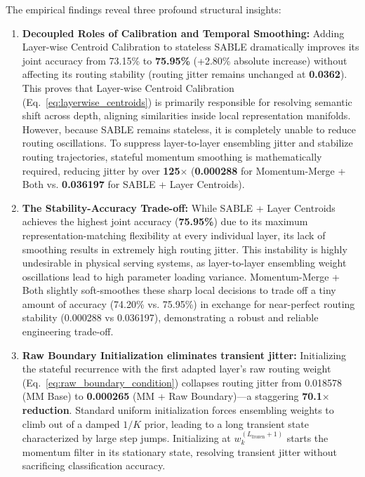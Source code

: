 \documentclass{article}
\theoremstyle{plain}
\theoremstyle{definition}
\theoremstyle{remark}
\begin{document}
    The empirical findings reveal three profound structural insights:
    \begin{enumerate}
        \item \textbf{Decoupled Roles of Calibration and Temporal Smoothing:} Adding Layer-wise Centroid Calibration to stateless SABLE dramatically improves its joint accuracy from 73.15\% to \textbf{75.95\%} (+2.80\% absolute increase) without affecting its routing stability (routing jitter remains unchanged at \textbf{0.0362}). This proves that Layer-wise Centroid Calibration (Eq.~\ref{eq:layerwise_centroids}) is primarily responsible for resolving semantic shift across depth, aligning similarities inside local representation manifolds. However, because SABLE remains stateless, it is completely unable to reduce routing oscillations. To suppress layer-to-layer ensembling jitter and stabilize routing trajectories, stateful momentum smoothing is mathematically required, reducing jitter by over \textbf{125$\times$} (\textbf{0.000288} for Momentum-Merge + Both vs. \textbf{0.036197} for SABLE + Layer Centroids).
        \item \textbf{The Stability-Accuracy Trade-off:} While SABLE + Layer Centroids achieves the highest joint accuracy (\textbf{75.95\%}) due to its maximum representation-matching flexibility at every individual layer, its lack of smoothing results in extremely high routing jitter. This instability is highly undesirable in physical serving systems, as layer-to-layer ensembling weight oscillations lead to high parameter loading variance. Momentum-Merge + Both slightly soft-smoothes these sharp local decisions to trade off a tiny amount of accuracy (74.20\% vs. 75.95\%) in exchange for near-perfect routing stability (0.000288 vs 0.036197), demonstrating a robust and reliable engineering trade-off.
        \item \textbf{Raw Boundary Initialization eliminates transient jitter:} Initializing the stateful recurrence with the first adapted layer's raw routing weight (Eq.~\ref{eq:raw_boundary_condition}) collapses routing jitter from 0.018578 (MM Base) to \textbf{0.000265} (MM + Raw Boundary)---a staggering \textbf{70.1$\times$ reduction}. Standard uniform initialization forces ensembling weights to climb out of a damped $1/K$ prior, leading to a long transient state characterized by large step jumps. Initializing at $w_k^{(L_{\text{frozen}}+1)}$ starts the momentum filter in its stationary state, resolving transient jitter without sacrificing classification accuracy.
    \end{enumerate}
\end{document}
